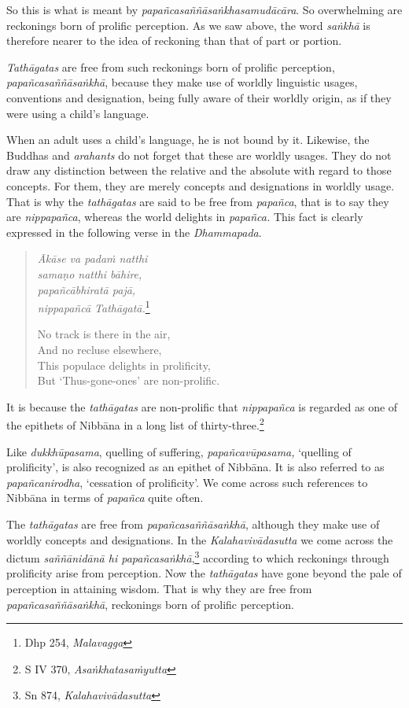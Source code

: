 So this is what is meant by \emph{papañcasaññāsaṅkhasamudācāra}. So overwhelming are reckonings born of prolific perception. As we saw above, the word \emph{saṅkhā} is therefore nearer to the idea of reckoning than that of part or portion.

\emph{Tathāgatas} are free from such reckonings born of prolific perception, \emph{papañcasaññāsaṅkhā}, because they make use of worldly linguistic usages, conventions and designation, being fully aware of their worldly origin, as if they were using a child's language.

When an adult uses a child's language, he is not bound by it. Likewise, the Buddhas and \emph{arahants} do not forget that these are worldly usages. They do not draw any distinction between the relative and the absolute with regard to those concepts. For them, they are merely concepts and designations in worldly usage. That is why the \emph{tathāgatas} are said to be free from \emph{papañca}, that is to say they are \emph{nippapañca}, whereas the world delights in \emph{papañca.} This fact is clearly expressed in the following verse in the \emph{Dhammapada}.

\begin{quote}
\emph{Ākāse va padaṁ natthi}\\
\emph{samaṇo natthi bāhire,}\\
\emph{papañcābhiratā pajā,}\\
\emph{nippapañcā Tathāgatā.}\footnote{Dhp 254, \emph{Malavagga}}

No track is there in the air,\\
And no recluse elsewhere,\\
This populace delights in prolificity,\\
But `Thus-gone-ones' are non-prolific.
\end{quote}

It is because the \emph{tathāgatas} are non-prolific that \emph{nippapañca} is regarded as one of the epithets of Nibbāna in a long list of thirty-three.\footnote{S IV 370, \emph{Asaṅkhatasaṁyutta}}

Like \emph{dukkhūpasama}, quelling of suffering, \emph{papañcavūpasama,} `quelling of prolificity', is also recognized as an epithet of Nibbāna. It is also referred to as \emph{papañcanirodha}, `cessation of prolificity'. We come across such references to Nibbāna in terms of \emph{papañca} quite often.

The \emph{tathāgatas} are free from \emph{papañcasaññāsaṅkhā}, although they make use of worldly concepts and designations. In the \emph{Kalahavivādasutta} we come across the dictum \emph{saññānidānā hi papañcasaṅkhā},\footnote{Sn 874, \emph{Kalahavivādasutta}} according to which reckonings through prolificity arise from perception. Now the \emph{tathāgatas} have gone beyond the pale of perception in attaining wisdom. That is why they are free from \emph{papañcasaññāsaṅkhā}, reckonings born of prolific perception.


